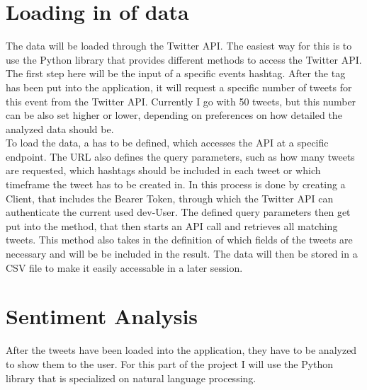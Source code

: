 \documentclass[a4paper,oneside,11pt]{scrreprt}
\begin{document}



\newpage


\chapter{Loading in of data}

The data will be loaded through the Twitter API. The easiest way for this is to use the Python library  that provides different methods to access the Twitter API. The first step here will be the input of a specific events hashtag. After the tag has been put into the application, it will request a specific number of tweets for this event from the Twitter API. Currently I go with 50 tweets, but this number can be also set higher or lower, depending on preferences on how detailed the analyzed data should be. \\

To load the data, a  has to be defined, which accesses the API at a specific endpoint. The URL also defines the query parameters, such as how many tweets are requested, which hashtags should be included in each tweet or which timeframe the tweet has to be created in. In  this process is done by creating a  Client, that includes the Bearer Token, through which the Twitter API can authenticate the current used dev-User. The defined query parameters then get put into the  method, that then starts an API call and retrieves all matching tweets. This method also takes in the definition of which fields of the tweets are necessary and will be be included in the result. The data will then be stored in a CSV file to make it easily accessable in a later session.


\chapter{Sentiment Analysis}

After the tweets have been loaded into the application, they have to be analyzed to show them to the user. For this part of the project I will use the Python library  that is specialized on natural language processing.
\end{document}
